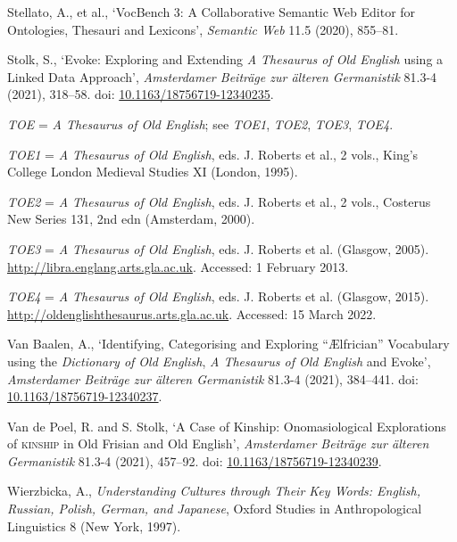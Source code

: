 \begin{list}{}
\item %
Stellato, A., et al., `VocBench 3: A Collaborative Semantic Web Editor for Ontologies, Thesauri and Lexicons', \textit{Semantic Web} 11.5 (2020), 855–81.

\item %
Stolk, S., `Evoke: Exploring and Extending \textit{A Thesaurus of Old English} using a Linked Data Approach', \textit{Amsterdamer Beiträge zur älteren Germanistik} 81.3-4 (2021), 318–58. doi: \href{https://doi.org/10.1163/18756719-12340235}{\url{10.1163/18756719-12340235}}.

\item %
\textit{TOE} = \textit{A Thesaurus of Old English}; see \textit{TOE1}, \textit{TOE2}, \textit{TOE3}, \textit{TOE4}.

\item %
\textit{TOE1} =	\textit{A Thesaurus of Old English}, eds. J. Roberts et al., 2 vols., King's College London Medieval Studies XI (London, 1995). 

\item %
\textit{TOE2} = \textit{A Thesaurus of Old English}, eds. J. Roberts et al., 2 vols., Costerus New Series 131, 2nd edn (Amsterdam, 2000).

\item %
\textit{TOE3} = \textit{A Thesaurus of Old English}, eds. J. Roberts et al. (Glasgow, 2005). \url{http://libra.englang.arts.gla.ac.uk}. Accessed: 1 February 2013.

\item %
\textit{TOE4} = \textit{A Thesaurus of Old English}, eds. J. Roberts et al. (Glasgow, 2015). \url{http://oldenglishthesaurus.arts.gla.ac.uk}. Accessed: 15 March 2022.

\item %
Van Baalen, A., `Identifying, Categorising and Exploring ``Ælfrician'' Vocabulary using the \textit{Dictionary of Old English}, \textit{A Thesaurus of Old English} and Evoke', \textit{Amsterdamer Beiträge zur älteren Germanistik} 81.3-4 (2021), 384–441. doi: \href{https://doi.org/10.1163/18756719-12340237}{\url{10.1163/18756719-12340237}}.

\item %
Van de Poel, R. and S. Stolk, `A Case of Kinship: Onomasiological Explorations of \textsc{kinship} in Old Frisian and Old English', \textit{Amsterdamer Beiträge zur älteren Germanistik} 81.3-4 (2021), 457–92. doi: \href{https://doi.org/10.1163/18756719-12340239}{\url{10.1163/18756719-12340239}}.

\item %
Wierzbicka, A., \textit{Understanding Cultures through Their Key Words: English, Russian, Polish, German, and Japanese}, Oxford Studies in Anthropological Linguistics 8 (New York, 1997). 



\end{list}



